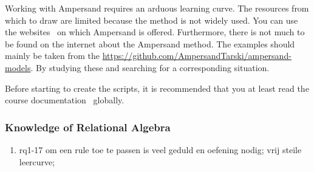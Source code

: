 Working with Ampersand requires an arduous learning curve.
The resources from which to draw are limited because the method is not widely used.
You can use the websites~\footnotemark{} on which Ampersand is offered.
Furthermore, there is not much to be found on the internet about the Ampersand method.
The examples should mainly be taken from the \url{https://github.com/AmpersandTarski/ampersand-models}.
By studying these and searching for a corresponding situation.

Before starting to create the scripts, it is recommended that you at least read the course documentation~ globally.



\subsubsection{Knowledge of Relational Algebra}
\begin{comment}
plaats hier de afgehandelde items.
\end{comment}

\begin{enumerate}
    \item rq1-17 om een rule toe te passen is veel geduld en oefening nodig; vrij steile leercurve; 
\end{enumerate}

